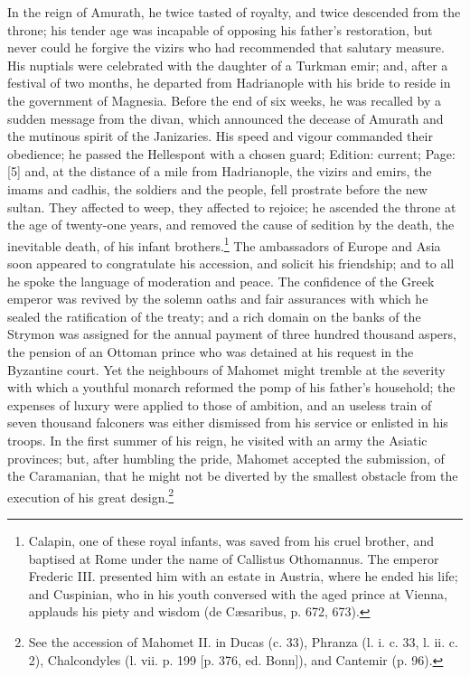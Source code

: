 In the reign of Amurath, he twice tasted of royalty, and twice descended from the throne; his tender age was incapable of opposing his father\texthebrew{}’s restoration, but never could he forgive the vizirs who had recommended that salutary measure. His nuptials were celebrated with the daughter of a Turkman emir; and, after a festival of two months, he departed from Hadrianople with his bride to reside in the government of Magnesia. Before the end of six weeks, he was recalled by a sudden message from the divan, which announced the decease of Amurath and the mutinous spirit of the Janizaries. His speed and vigour commanded their obedience; he passed the Hellespont with a chosen guard; Edition: current; Page: [5] and, at the distance of a mile from Hadrianople, the vizirs and emirs, the imams and cadhis, the soldiers and the people, fell prostrate before the new sultan. They affected to weep, they affected to rejoice; he ascended the throne at the age of twenty-one years, and removed the cause of sedition by the death, the inevitable death, of his infant brothers.\footnote{Calapin, one of these royal infants, was saved from his cruel brother, and baptised at Rome under the name of Callistus Othomannus. The emperor Frederic III. presented him with an estate in Austria, where he ended his life; and Cuspinian, who in his youth conversed with the aged prince at Vienna, applauds his piety and wisdom (de Cæsaribus, p. 672, 673).} The ambassadors of Europe and Asia soon appeared to congratulate his accession, and solicit his friendship; and to all he spoke the language of moderation and peace. The confidence of the Greek emperor was revived by the solemn oaths and fair assurances with which he sealed the ratification of the treaty; and a rich domain on the banks of the Strymon was assigned for the annual payment of three hundred thousand aspers, the pension of an Ottoman prince who was detained at his request in the Byzantine court. Yet the neighbours of Mahomet might tremble at the severity with which a youthful monarch reformed the pomp of his father\texthebrew{}’s household; the expenses of luxury were applied to those of ambition, and an useless train of seven thousand falconers was either dismissed from his service or enlisted in his troops. In the first summer of his reign, he visited with an army the Asiatic provinces; but, after humbling the pride, Mahomet accepted the submission, of the Caramanian, that he might not be diverted by the smallest obstacle from the execution of his great design.\footnote{See the accession of Mahomet II. in Ducas (c. 33), Phranza (l. i. c. 33, l. ii. c. 2), Chalcondyles (l. vii. p. 199 [p. 376, ed. Bonn]), and Cantemir (p. 96).}

